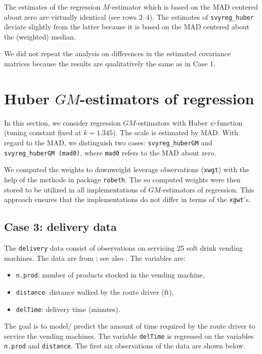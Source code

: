 \documentclass[a4paper,oneside,11pt,DIV=12]{scrartcl}
\newcommand{\code}[1]{{\texttt{#1}}}
\begin{document}
\noindent The estimates of the regression $M$-estimator which is based on
the MAD centered about zero are virtually identical (see rows 2--4). The
estimates of \code{svyreg\_huber} deviate slightly from the latter
because it is based on the MAD centered about the (weighted) median.

We did not repeat the analysis on differences in the estimated
covariance matrices because the results are qualitatively the same
as in Case 1.

\section{Huber $GM$-estimators of regression}\label{sec:gmest}
In this section, we consider regression $GM$-estimators with Huber
$\psi$-function (tuning constant fixed at $k=1.345$). The scale is
estimated by MAD. With regard to the MAD, we distinguish two cases:
\code{svyreg\_huberGM} and \code{svyreg\_huberGM (mad0)}, where
\code{mad0} refers to the MAD about zero.

We computed the weights to downweight leverage observations
(\code{xwgt}) with the help of the methods in package \code{robeth}.
The so computed weights were then stored to be utilized in all
implementations of $GM$-estimators of regression. This approach ensures
that the implementations do not differ in terms of the \code{xgwt}'s.

\subsection{Case 3: delivery data}
The \code{delivery} data consist of observations on servicing 25
soft drink vending machines. The data are from \cite{montgomerypeck};
see also \cite{rousseeuwleroy}. The variables are:

\begin{itemize}
    \item \code{n.prod}: number of products stocked in the vending machine,
    \item \code{distance}: distance walked by the route driver (ft),
    \item \code{delTime}: delivery time (minutes).
\end{itemize}

\noindent The goal is to model/ predict the amount of time required by
the route driver to service the vending machines.  The variable
\code{delTime} is regressed on the variables
\code{n.prod} and \code{distance}. The first six observations
of the data are shown below.
\end{document}
